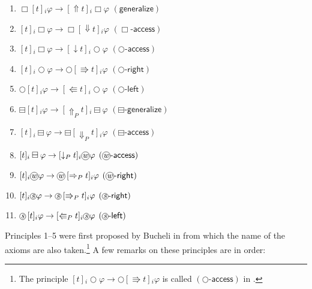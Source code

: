 \documentclass[envcountsect,envcountsame,oribibl,orivec]{llncs}
\newcommand*\circled[1]{\tikz[baseline=(char.base)]{
		\node[shape=circle,draw,inner sep=0.4pt] (char) {#1};}}
\newcommand{\limplies}{\rightarrow}
\newcommand{\lnext}{\bigcirc}
\newcommand{\lalways}{\Box}
\newcommand{\lsofar}{\boxminus}
\newcommand{\wprevious}{\circled{\textit{w}}}
\newcommand{\sprevious}{\circled{\textit{s}}}
\newcommand{\jbox}[1]{\left[#1\right]\!}
\newcommand{\tnext}{\Rrightarrow}
\newcommand{\tprev}{\Lleftarrow}
\newcommand{\talwaysaccess}{\Downarrow}
\newcommand{\tgeneralize}{\Uparrow}
\newcommand{\tnextaccess}{\downarrow}
\newcommand{\thenceforthaccess}{\Downarrow_P}
\newcommand{\thenceforthgeneralize}{\Uparrow_P}
\newcommand{\tprevaccess}{\downarrow_P}
\newcommand{\tsprevright}{\Rrightarrow_P}
\newcommand{\tsprevleft}{\Lleftarrow_P}
\newcommand{\twprevright}{\Rightarrow_P}
\newcommand{\agent}{i}
\newcommand{\alwaysaccessprinciple}{\ensuremath{(\lalways\textsf{-access})}}
\newcommand{\generalizeprinciple}{\ensuremath{(\textsf{generalize})}}
\newcommand{\nextaccessprinciple}{\ensuremath{(\lnext\textsf{-access})}}
\newcommand{\nextrightshiftprinciple}{\ensuremath{(\lnext\textsf{-right})}}
\newcommand{\nextleftshiftprinciple}{\ensuremath{(\lnext\textsf{-left})}}
\newcommand{\pastgeneralizeprinciple}{\ensuremath{(\lsofar\textsf{-generalize})}}
\newcommand{\pastaccessprinciple}{\ensuremath{(\lsofar\textsf{-access})}}
\newcommand{\wprevaccessprinciple}{\ensuremath{(\wprevious\textsf{-access})}}
\newcommand{\wprevrightshiftprinciple}{\ensuremath{(\wprevious\textsf{-right})}}
\newcommand{\sprevrightshiftprinciple}{\ensuremath{(\sprevious\textsf{-right})}}
\newcommand{\sprevleftshiftprinciple}{\ensuremath{(\sprevious\textsf{-left})}}
\renewcommand{\phi}{\varphi}
\begin{document}
\begin{enumerate}
	\item $\lalways \jbox{t}_\agent \phi \limplies \jbox{\tgeneralize t}_\agent \lalways  \phi$ \hfill \generalizeprinciple
	\item $\jbox{t}_\agent \lalways \phi \limplies \lalways \jbox{\talwaysaccess t}_\agent \phi$ \hfill \alwaysaccessprinciple
	\item $\jbox{t}_\agent \lalways \phi \limplies \jbox{\tnextaccess t}_\agent \lnext \phi$ \hfill \nextaccessprinciple
	\item $\jbox{t}_\agent \lnext \phi \limplies \lnext \jbox{\tnext t}_\agent \phi$ \hfill \nextrightshiftprinciple
	\item $\lnext \jbox{t}_\agent \phi \limplies \jbox{\tprev t}_\agent \lnext \phi$ \hfill \nextleftshiftprinciple
	\vspace*{0.1cm}
	\item $\lsofar \jbox{t}_\agent \phi \limplies \jbox{\thenceforthgeneralize t}_\agent \lsofar  \phi$ \hfill \pastgeneralizeprinciple
	\item $\jbox{t}_\agent \lsofar \phi \limplies \lsofar \jbox{\thenceforthaccess t}_\agent \phi$ \hfill \pastaccessprinciple
	\item $\jbox{t}_\agent \lsofar \phi \limplies \jbox{\tprevaccess t}_\agent \wprevious \phi$ \hfill \wprevaccessprinciple
	\item $\jbox{t}_\agent \wprevious \phi \limplies \wprevious \jbox{\twprevright t}_\agent \phi$ \hfill \wprevrightshiftprinciple
	\item $\jbox{t}_\agent \sprevious \phi \limplies \sprevious \jbox{\tsprevright t}_\agent \phi$ \hfill \sprevrightshiftprinciple
	\item $\sprevious \jbox{t}_\agent \phi \limplies \jbox{\tsprevleft t}_\agent \sprevious \phi$ \hfill \sprevleftshiftprinciple
\end{enumerate}

Principles 1--5 were first proposed by Bucheli in \cite{Bucheli15} from which the name of the axioms are also taken.\footnote{The principle $\jbox{t}_\agent \lnext \phi \limplies \lnext \jbox{\tnext t}_\agent \phi$ is called $\nextaccessprinciple$ in \cite{BucheliGhariStuder2017}.}
A few remarks on these principles are in order:
\end{document}
